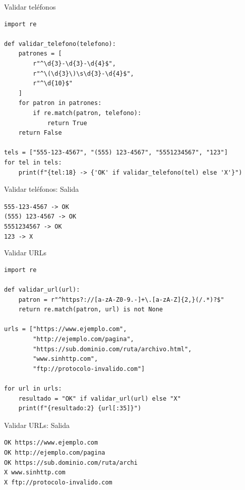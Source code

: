 \documentclass{beamer}
\begin{document}
\begin{frame}[fragile]{Validar teléfonos \faPhone}
\begin{lstlisting}
import re

def validar_telefono(telefono):
    patrones = [
        r"^\d{3}-\d{3}-\d{4}$",
        r"^\(\d{3}\)\s\d{3}-\d{4}$",
        r"^\d{10}$"
    ]
    for patron in patrones:
        if re.match(patron, telefono):
            return True
    return False

tels = ["555-123-4567", "(555) 123-4567", "5551234567", "123"]
for tel in tels:
    print(f"{tel:18} -> {'OK' if validar_telefono(tel) else 'X'}")
\end{lstlisting}
\end{frame}

\begin{frame}[fragile]{Validar teléfonos: Salida \faArrowCircleRight}
\begin{tcolorbox}[colback=green!10,colframe=green,title={\small\faArrowCircleRight \ Salida},coltitle=fg0,left=3pt,right=3pt,top=3pt,bottom=3pt,boxsep=2pt]
\small\texttt{555-123-4567       -> OK\\
(555) 123-4567     -> OK\\
5551234567         -> OK\\
123                -> X}
\end{tcolorbox}
\end{frame}

\begin{frame}[fragile]{Validar URLs \faLink}
\begin{lstlisting}
import re

def validar_url(url):
    patron = r"^https?://[a-zA-Z0-9.-]+\.[a-zA-Z]{2,}(/.*)?$"
    return re.match(patron, url) is not None

urls = ["https://www.ejemplo.com",
        "http://ejemplo.com/pagina",
        "https://sub.dominio.com/ruta/archivo.html",
        "www.sinhttp.com",
        "ftp://protocolo-invalido.com"]

for url in urls:
    resultado = "OK" if validar_url(url) else "X"
    print(f"{resultado:2} {url[:35]}")
\end{lstlisting}
\end{frame}

\begin{frame}[fragile]{Validar URLs: Salida \faArrowCircleRight}
\begin{tcolorbox}[colback=green!10,colframe=green,title={\small\faArrowCircleRight \ Salida},coltitle=fg0,left=3pt,right=3pt,top=3pt,bottom=3pt,boxsep=2pt]
\small\texttt{OK https://www.ejemplo.com\\
OK http://ejemplo.com/pagina\\
OK https://sub.dominio.com/ruta/archi\\
X  www.sinhttp.com\\
X  ftp://protocolo-invalido.com}
\end{tcolorbox}
\end{frame}
\end{document}
